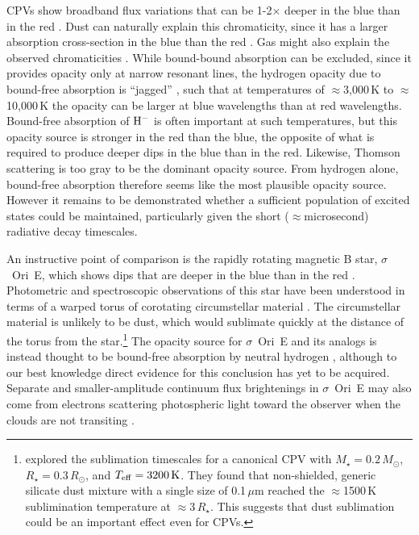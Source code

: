 \documentclass[11pt,twocolumn,tighten]{aastex63}
\begin{document}
CPVs show broadband flux variations that can be 1-2$\times$ deeper in
the blue than in the red
\citep{2017PASJ...69L...2O,2020AJ....160...86B,2022AJ....163..144G,2023MNRAS.518.2921K}.
Dust can naturally explain this chromaticity, since it has a larger
absorption cross-section in the blue than the red
\citep[e.g.][]{1989ApJ...345..245C}.  Gas might also explain the observed
chromaticities \citep{1992oasp.book.....G}.  While bound-bound
absorption can be excluded, since it provides opacity only at narrow
resonant lines, the hydrogen opacity due to bound-free
absorption is ``jagged'' \citep[see][Figure 8.5 and
Eq.~8.8]{1992oasp.book.....G}, such that at temperatures of
$\approx$3{,}000\,K to $\approx$10{,}000\,K the opacity can be larger
at blue wavelengths than at red wavelengths.  Bound-free absorption of
${\rm H}^{-}$ is often important at such temperatures, but this
opacity source is stronger in the red than the blue, the opposite of
what is required to produce deeper dips in the blue than in the red.
Likewise, Thomson scattering is too gray to be the dominant opacity
source.  From hydrogen alone, bound-free absorption therefore seems
like the most plausible opacity source.  However it remains to be
demonstrated whether a sufficient population of excited states could
be maintained, particularly given the short ($\approx$microsecond)
radiative decay timescales.

An instructive point of comparison is the rapidly rotating magnetic B
star, $\sigma$~Ori~E, which shows dips that are deeper in the blue
than in the red \citep{1977ApJ...216L..31H}.  Photometric and
spectroscopic observations of this star have been understood in terms
of a warped torus of corotating circumstellar material
\citep{1978ApJ...224L...5L,1985Ap&SS.116..285N,2005ApJ...630L..81T}.
The circumstellar material is unlikely to be dust, which would
sublimate quickly at the distance of the torus from the
star.\footnote{\citet{2019ApJ...876..127Z} explored the sublimation
timescales for a canonical CPV with $M_\star=0.2\,M_\odot$,
$R_\star=0.3\,R_\odot$, and $T_{\rm eff}=3200\,{\rm K}$.  They found
that non-shielded, generic silicate dust mixture \citep{1985ApJS...57..587D} with a
single size of 0.1\,$\mu$m reached the $\approx$1500\,K sublimination
temperature at $\approx$3\,$R_\star$.  This suggests that dust
sublimation could be an important effect even for CPVs. }  The opacity
source for $\sigma$~Ori~E and its analogs is instead thought to be
bound-free absorption by neutral hydrogen \citep{1985Ap&SS.116..285N},
although to our best knowledge direct evidence for this conclusion has
yet to be acquired.  Separate and smaller-amplitude continuum flux
brightenings in $\sigma$~Ori~E may also come from electrons scattering
photospheric light toward the observer when the clouds are not
transiting \citep{2022MNRAS.511.4815B}.
\end{document}
